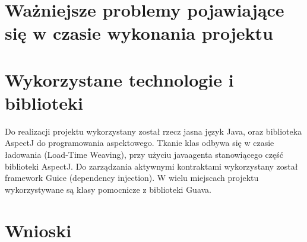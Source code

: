 \documentclass[12pt,a4paper,titlepage]{article}
\begin{document}
\section[Problemy]{Ważniejsze problemy pojawiające się w czasie wykonania projektu}

\section{Wykorzystane technologie i biblioteki}
Do realizacji projektu wykorzystany został rzecz jasna język Java, oraz biblioteka AspectJ do programowania aspektowego. Tkanie klas odbywa się w czasie ładowania (Load-Time Weaving), przy użyciu javaagenta stanowiącego część biblioteki AspectJ. Do zarządzania aktywnymi kontraktami wykorzystany został framework Guice (dependency injection). W wielu miejscach projektu wykorzystywane są klasy pomocnicze z biblioteki Guava.
\section{Wnioski}
\end{document}
